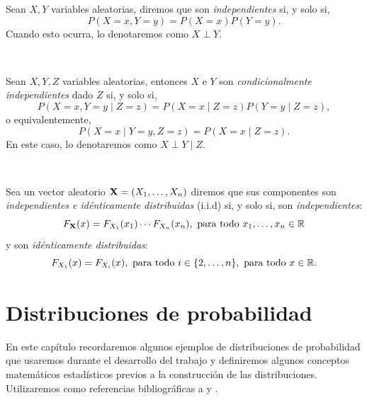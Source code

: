 \documentclass[oneside,openright,titlepage,numbers=noenddot,openany,headinclude,footinclude=true,
cleardoublepage=empty,abstractoff,BCOR=5mm,paper=a4,fontsize=12pt,main=spanish]{scrreprt}
\begin{document}
\begin{definition}
Sean $X,Y$ variables aleatorias, diremos que son \textit{independientes} si, y solo si, $$P(X=x,Y=y)=P(X=x) P(Y=y).$$ Cuando esto ocurra, lo denotaremos como $X \perp Y$.
\end{definition}\

\begin{definition}
Sean $X,Y,Z$ variables aleatorias, entonces $X$ e $Y$ son \textit{condicionalmente independientes} dado $Z$ si, y solo si, $$P(X=x,Y=y \mid Z=z)=P(X=x \mid Z=z) P(Y=y \mid Z=z),$$
o equivalentemente, $$P(X=x \mid Y=y, Z=z)=P(X=x \mid Z=z).$$
En este caso, lo denotaremos como $X \perp Y \mid Z$.
\end{definition}\

\begin{definition}
Sea un vector aleatorio $\textbf{X}=(X_1,\dots,X_n)$ diremos que sus componentes son \textit{independientes e idénticamente distribuidas} (i.i.d) si, y solo si, son \textit{independientes}: $$F_{\nm{X}}(x)=F_{X_1}(x_1)\cdots F_{X_n}(x_n), \ \text{para todo} \ x_1,\dots,x_n \in \R$$
y son \textit{idénticamente distribuidas}: $$F_{X_1}(x)=F_{X_i}(x), \ \text{para todo} \ i \in \{2,\dots,n\}, \ \text{para todo} \ x \in \R.$$
\end{definition}


\chapter{Distribuciones de probabilidad} \label{ch:disprob}

En este capítulo recordaremos algunos ejemplos de distribuciones de probabilidad que usaremos durante el desarrollo del trabajo y definiremos algunos conceptos matemáticos estadísticos previos a la construcción de las distribuciones. Utilizaremos como referencias bibliográficas a \cite{random2004} y \cite{probability2014}.
\end{document}
